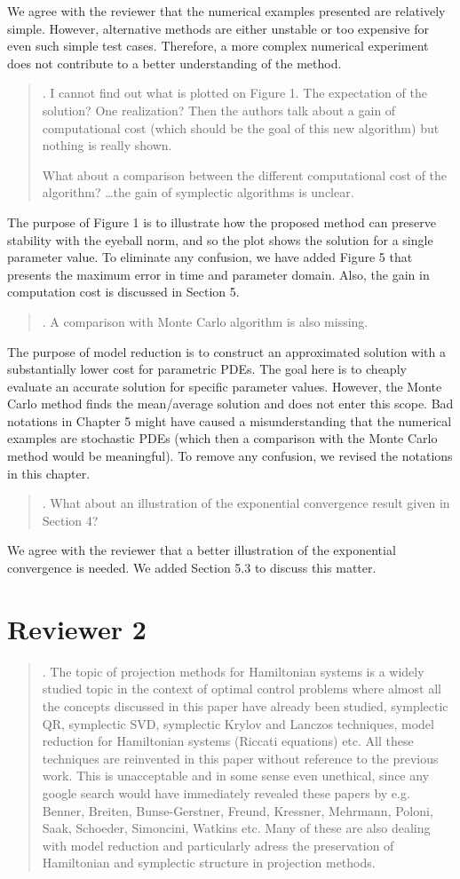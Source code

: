 \documentclass[a4paper]{article}
\newcommand{\breview}{\begin{quotation}\begin{bf}\noindent}
\newcommand{\ereview}{\end{bf}\end{quotation}}
\begin{document}
We agree with the reviewer that the numerical examples presented are relatively simple. However, alternative methods are either unstable or too expensive for even such simple test cases. Therefore, a more complex numerical experiment does not contribute to a better understanding of the method. 


\breview
4. I cannot find out what is plotted on Figure 1. The expectation of the solution? One realization? Then the authors talk about a gain of computational cost (which should be the goal of this new algorithm) but nothing is really shown. 

What about a comparison between the different computational cost of the algorithm? \dots the gain of symplectic algorithms is unclear. 
\ereview

The purpose of Figure 1 is to illustrate how the proposed method can preserve stability with the eyeball norm, and so the plot shows the solution for a single parameter value. To eliminate any confusion, we have added Figure 5 that presents the maximum error in time and parameter domain. Also, the gain in computation cost is discussed in Section 5.

\breview
5. A comparison with Monte Carlo algorithm is also missing.  
\ereview

The purpose of model reduction is to construct an approximated solution with a substantially lower cost for parametric PDEs. The goal here is to cheaply evaluate an accurate solution for specific parameter values. However, the Monte Carlo method finds the mean/average solution and does not enter this scope. Bad notations in Chapter 5 might have caused a misunderstanding that the numerical examples are stochastic PDEs (which then a comparison with the Monte Carlo method would be meaningful). To remove any confusion, we revised the notations in this chapter.

\breview
6. What about an illustration of the exponential convergence result given in Section 4? 
\ereview

We agree with the reviewer that a better illustration of the exponential convergence is needed. We added Section 5.3 to discuss this matter.

\section*{Reviewer 2}

\breview
1. The topic of projection methods for Hamiltonian systems is a widely studied topic in the context of optimal control problems where almost all the concepts discussed in this paper have already been studied, symplectic QR, symplectic SVD, symplectic Krylov and Lanczos techniques, model reduction for Hamiltonian systems (Riccati equations) etc. All these techniques are reinvented in this paper without reference to the previous work. This is unacceptable and in some sense even unethical, since any google search would have immediately revealed these papers by e.g. Benner, Breiten, Bunse-Gerstner, Freund, Kressner, Mehrmann, Poloni, Saak, Schoeder, Simoncini, Watkins etc. Many of these are also dealing with model reduction and particularly adress the preservation of Hamiltonian and symplectic structure in projection methods.
\ereview
\end{document}
